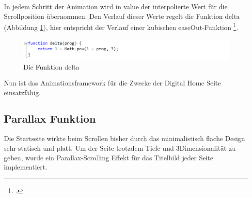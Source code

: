 In jedem Schritt der Animation wird in value der interpolierte Wert für die Scrollposition übernommen. Den Verlauf dieser Werte regelt die Funktion delta (Abbildung \ref{js_delta}), hier entspricht der Verlauf einer kubischen easeOut-Funktion \footcite[vgl.][]{easeOut}.

\begin{figure} [h]
\includegraphics[width=\textwidth]{./img/js_delta.png}
\caption{Die Funktion delta}
\label{js_delta}
\end{figure}

Nun ist das Animationsframework für die Zwecke der Digital Home Seite einsatzfähig.

\subsection{Parallax Funktion}
Die Startseite wirkte beim Scrollen bisher durch das minimalistisch flache Design sehr statisch und platt. Um der Seite trotzdem Tiefe und 3Dimensionalität zu geben, wurde ein Parallax-Scrolling Effekt für das Titelbild jeder Seite implementiert.

